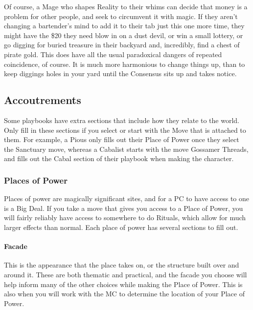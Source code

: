 \documentclass[
]{article}
\begin{document}
Of course, a Mage who shapes Reality to their whims can decide that
money is a problem for other people, and seek to circumvent it with
magic. If they aren't changing a bartender's mind to add it to their tab
just this one more time, they might have the \$20 they need blow in on a
dust devil, or win a small lottery, or go digging for buried treasure in
their backyard and, incredibly, find a chest of pirate gold. This does
have all the usual paradoxical dangers of repeated coincidence, of
course. It is much more harmonious to change things up, than to keep
diggings holes in your yard until the Consensus sits up and takes
notice.

\hypertarget{accoutrements}{%
\subsection{Accoutrements}\label{accoutrements}}

Some playbooks have extra sections that include how they relate to the
world. Only fill in these sections if you select or start with the Move
that is attached to them. For example, a Pious only fills out their
Place of Power once they select the Sanctuary move, whereas a Cabalist
starts with the move Gossamer Threads, and fills out the Cabal section
of their playbook when making the character.

\hypertarget{places-of-power}{%
\subsubsection{Places of Power}\label{places-of-power}}

Places of power are magically significant sites, and for a PC to have
access to one is a Big Deal. If you take a move that gives you access to
a Place of Power, you will fairly reliably have access to somewhere to
do Rituals, which allow for much larger effects than normal. Each place
of power has several sections to fill out.

\hypertarget{facade}{%
\paragraph{Facade}\label{facade}}

This is the appearance that the place takes on, or the structure built
over and around it. These are both thematic and practical, and the
facade you choose will help inform many of the other choices while
making the Place of Power. This is also when you will work with the MC
to determine the location of your Place of Power.
\end{document}
